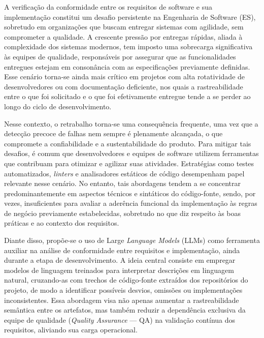 \label{cap:introducao}

A verificação da conformidade entre os requisitos de software e sua implementação constitui um desafio persistente na Engenharia de Software (ES), sobretudo em organizações que buscam entregar sistemas com agilidade, sem comprometer a qualidade. A crescente pressão por entregas rápidas, aliada à complexidade dos sistemas modernos, tem imposto uma sobrecarga significativa às equipes de qualidade, responsáveis por assegurar que as funcionalidades entregues estejam em consonância com as especificações previamente definidas. Esse cenário torna-se ainda mais crítico em projetos com alta rotatividade de desenvolvedores ou com documentação deficiente, nos quais a rastreabilidade entre o que foi solicitado e o que foi efetivamente entregue tende a se perder ao longo do ciclo de desenvolvimento.

Nesse contexto, o retrabalho torna-se uma consequência frequente, uma vez que a detecção precoce de falhas nem sempre é plenamente alcançada, o que compromete a confiabilidade e a sustentabilidade do produto. Para mitigar tais desafios, é comum que desenvolvedores e equipes de software utilizem ferramentas que contribuam para otimizar e agilizar suas atividades. Estratégias como testes automatizados, \textit{linters} e analisadores estáticos de código desempenham papel relevante nesse cenário. No entanto, tais abordagens tendem a se concentrar predominantemente em aspectos técnicos e sintáticos do código-fonte, sendo, por vezes, insuficientes para avaliar a aderência funcional da implementação às regras de negócio previamente estabelecidas, sobretudo no que diz respeito às boas práticas e ao contexto dos requisitos.

Diante disso, propõe-se o uso de Large \textit{Language Models} (LLMs) como ferramenta auxiliar na análise de conformidade entre requisitos e implementação, ainda durante a etapa de desenvolvimento. A ideia central consiste em empregar modelos de linguagem treinados para interpretar descrições em linguagem natural, cruzando-as com trechos de código-fonte extraídos dos repositórios do projeto, de modo a identificar possíveis desvios, omissões ou implementações inconsistentes. Essa abordagem visa não apenas aumentar a rastreabilidade semântica entre os artefatos, mas também reduzir a dependência exclusiva da equipe de qualidade (\textit{Quality Assurance} — QA) na validação contínua dos requisitos, aliviando sua carga operacional.

